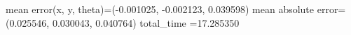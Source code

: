 mean error(x, y, theta)=(-0.001025, -0.002123, 0.039598)
mean absolute error=(0.025546, 0.030043, 0.040764)
total_time =17.285350